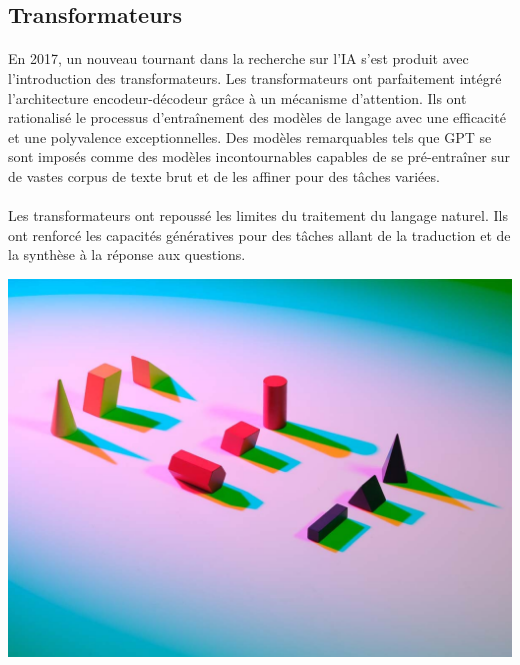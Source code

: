 \subsection{Transformateurs}
\begin{center}
	\begin{minipage}{0.5\textwidth}
		\paragraph{}
		En 2017, un nouveau tournant dans la recherche sur l'IA s'est produit avec l'introduction
		des transformateurs. Les transformateurs ont parfaitement intégré l'architecture
		encodeur-décodeur grâce à un mécanisme d'attention. Ils ont rationalisé le processus
		d'entraînement des modèles de langage avec une efficacité et une polyvalence
		exceptionnelles. Des modèles remarquables tels que GPT se sont imposés comme
		des modèles incontournables capables de se pré-entraîner sur de vastes
		corpus de texte brut et de les affiner pour des tâches variées.

		\paragraph{}
		Les transformateurs ont repoussé les limites du traitement du langage naturel.
		Ils ont renforcé les capacités génératives pour des tâches allant de la
		traduction et de la synthèse à la réponse aux questions.
	\end{minipage}%
	\hfill
	\begin{minipage}{0.4\textwidth}
		\centering
		\includegraphics[width=\linewidth]{images/transfor.jpg}
	\end{minipage}
\end{center}
